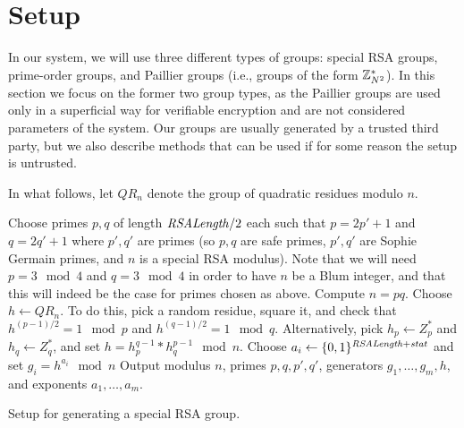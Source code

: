 \section{Setup}
In our system, we will use three different types of groups: special RSA
groups, prime-order groups, and Paillier groups (i.e., groups of the form
$\mathbb{Z}_{N^2}^*$).  In this section we focus on the former two group types, as the
Paillier groups are used only in a superficial way for verifiable encryption
and are not considered parameters of the system.  Our groups are usually 
generated by a trusted third party, but 
we also describe methods that can be used if for some reason the setup is 
untrusted.

In what follows, let $QR_n$ denote the group of quadratic residues modulo $n$.

\begin{algorithm}[H]\label{setupRSA}
\dontprintsemicolon

\BlankLine

 \;
\Indp
  Choose primes $p,q$ of length $\mathit{RSALength}/2$ each such that $p = 2p'+1$ and
$q = 2q'+1$ where $p',q'$ are primes (so $p,q$ are safe primes, $p',q'$ are
Sophie Germain primes, and $n$ is a special RSA modulus). Note that we will
need $p = 3 \mod 4$ and $q = 3 \mod 4$ in order to have $n$ be a Blum
integer, and that this will indeed be the case for primes chosen as above. \;
  Compute $n = pq$. \;
  Choose $h \leftarrow QR_n$.  To do this, pick a random residue, square it, and check that $h^{(p-1)/2} = 1 \mod p$ and $h^{(q-1)/2} = 1 \mod q$. Alternatively, pick $h_p \leftarrow Z_{p}^*$ and $h_q \leftarrow Z_{q}^*$, and set $h = h_{p}^{q-1} * h_{q}^{p-1} \mod n$. \;
    {Choose $a_i \leftarrow \{0,1\}^{\mathit{RSALength} + \mathit{stat}}$ and set $g_i = h^{a_i} \mod n$ \;}
  Output modulus $n$, primes $p,q,p',q'$, generators $g_1,\ldots,g_m,h$, and exponents $a_1,\ldots,a_m$. \;
\Indm

\caption{Setup for generating a special RSA group.}
\end{algorithm}


